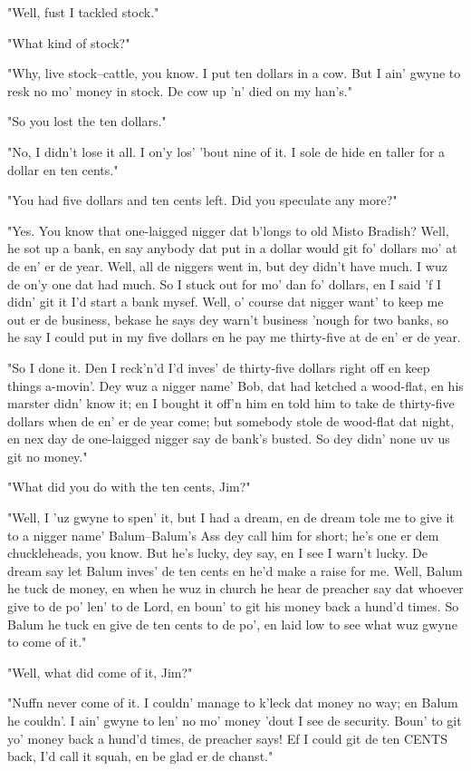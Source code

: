 "Well, fust I tackled stock."

"What kind of stock?"

"Why, live stock--cattle, you know.  I put ten dollars in a cow.  But I
ain' gwyne to resk no mo' money in stock.  De cow up 'n' died on my
han's."

"So you lost the ten dollars."

"No, I didn't lose it all.  I on'y los' 'bout nine of it.  I sole de hide
en taller for a dollar en ten cents."

"You had five dollars and ten cents left.  Did you speculate any more?"

"Yes.  You know that one-laigged nigger dat b'longs to old Misto Bradish?
Well, he sot up a bank, en say anybody dat put in a dollar would git fo'
dollars mo' at de en' er de year.  Well, all de niggers went in, but dey
didn't have much.  I wuz de on'y one dat had much.  So I stuck out for
mo' dan fo' dollars, en I said 'f I didn' git it I'd start a bank mysef.
Well, o' course dat nigger want' to keep me out er de business, bekase he
says dey warn't business 'nough for two banks, so he say I could put in
my five dollars en he pay me thirty-five at de en' er de year.

"So I done it.  Den I reck'n'd I'd inves' de thirty-five dollars right
off en keep things a-movin'.  Dey wuz a nigger name' Bob, dat had ketched
a wood-flat, en his marster didn' know it; en I bought it off'n him en
told him to take de thirty-five dollars when de en' er de year come; but
somebody stole de wood-flat dat night, en nex day de one-laigged nigger
say de bank's busted.  So dey didn' none uv us git no money."

"What did you do with the ten cents, Jim?"

"Well, I 'uz gwyne to spen' it, but I had a dream, en de dream tole me to
give it to a nigger name' Balum--Balum's Ass dey call him for short; he's
one er dem chuckleheads, you know.  But he's lucky, dey say, en I see I
warn't lucky.  De dream say let Balum inves' de ten cents en he'd make a
raise for me.  Well, Balum he tuck de money, en when he wuz in church he
hear de preacher say dat whoever give to de po' len' to de Lord, en boun'
to git his money back a hund'd times.  So Balum he tuck en give de ten
cents to de po', en laid low to see what wuz gwyne to come of it."

"Well, what did come of it, Jim?"

"Nuffn never come of it.  I couldn' manage to k'leck dat money no way; en
Balum he couldn'.  I ain' gwyne to len' no mo' money 'dout I see de
security.  Boun' to git yo' money back a hund'd times, de preacher says!
Ef I could git de ten CENTS back, I'd call it squah, en be glad er de
chanst."

